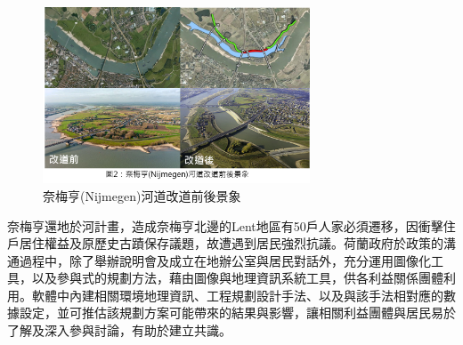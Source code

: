 \documentclass[a4paper,12pt]{article}
\begin{document}
\begin{figure}[htbp]
\centering
\includegraphics[width=300]{images/Nijmegen.png}
\caption{\label{fig:FigName}奈梅亨(Nijmegen)河道改道前後景象}
\end{figure}

奈梅亨還地於河計畫，造成奈梅亨北邊的Lent地區有50戶人家必須遷移，因衝擊住戶居住權益及原歷史古蹟保存議題，故遭遇到居民強烈抗議。荷蘭政府於政策的溝通過程中，除了舉辦說明會及成立在地辦公室與居民對話外，充分運用圖像化工具，以及參與式的規劃方法，藉由圖像與地理資訊系統工具，供各利益關係團體利用。軟體中內建相關環境地理資訊、工程規劃設計手法、以及與該手法相對應的數據設定，並可推估該規劃方案可能帶來的結果與影響，讓相關利益團體與居民易於了解及深入參與討論，有助於建立共識。\\
\end{document}
